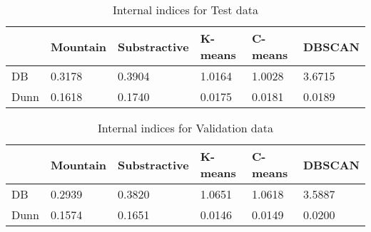 \begin{table}
    \begin{tabular}{l|lllll}
             & Mountain & Substractive & K-means & C-means & DBSCAN\\\hline
        DB   & 0.3178 & 0.3904 & 1.0164 & 1.0028 & 3.6715\\
        Dunn & 0.1618 & 0.1740 & 0.0175 & 0.0181 & 0.0189
    \end{tabular}
    \caption{Internal indices for Test data\label{tab:external:test}}
\end{table}

\begin{table}
    \begin{tabular}{l|lllll}
             & Mountain & Substractive & K-means & C-means & DBSCAN\\\hline
        DB   & 0.2939 & 0.3820 & 1.0651 & 1.0618 & 3.5887\\
        Dunn & 0.1574 & 0.1651 & 0.0146 & 0.0149 & 0.0200
    \end{tabular}
    \caption{Internal indices for Validation data\label{tab:external:validation}}
\end{table}



